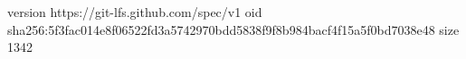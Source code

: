 version https://git-lfs.github.com/spec/v1
oid sha256:5f3fac014e8f06522fd3a5742970bdd5838f9f8b984bacf4f15a5f0bd7038e48
size 1342
